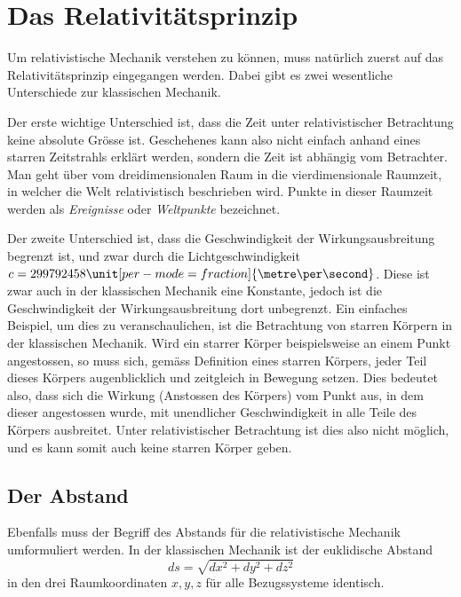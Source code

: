 
\section{Das Relativitätsprinzip 
\label{relativ:section:relativistik}}

Um relativistische Mechanik verstehen zu können,
muss natürlich zuerst auf das Relativitätsprinzip eingegangen werden.
Dabei gibt es zwei wesentliche Unterschiede zur klassischen Mechanik.

Der erste wichtige Unterschied ist, dass die Zeit unter relativistischer Betrachtung keine absolute Grösse ist.
Geschehenes kann also nicht einfach anhand eines starren Zeitstrahls erklärt werden, sondern die Zeit ist abhängig vom Betrachter.
Man geht über vom dreidimensionalen Raum in die vierdimensionale Raumzeit, in welcher die Welt relativistisch beschrieben wird.
Punkte in dieser Raumzeit werden als \emph{Ereignisse} oder \emph{Weltpunkte} bezeichnet.

Der zweite Unterschied ist,
dass die Geschwindigkeit der Wirkungsausbreitung begrenzt ist,
und zwar durch die Lichtgeschwindigkeit
\(c=299792458\unit[per-mode = fraction]{\metre\per\second}\).
Diese ist zwar auch in der klassischen Mechanik eine Konstante,
jedoch ist die Geschwindigkeit der Wirkungsausbreitung dort unbegrenzt.
Ein einfaches Beispiel, um dies zu veranschaulichen,
ist die Betrachtung von starren Körpern in der klassischen Mechanik.
Wird ein starrer Körper beispielsweise an einem Punkt angestossen,
so muss sich, gemäss Definition eines starren Körpers,
jeder Teil dieses Körpers augenblicklich und zeitgleich in Bewegung setzen.
Dies bedeutet also, dass sich die Wirkung (Anstossen des Körpers)
vom Punkt aus, in dem dieser angestossen wurde,
mit unendlicher Geschwindigkeit in alle Teile des Körpers ausbreitet.
Unter relativistischer Betrachtung ist dies also nicht möglich,
und es kann somit auch keine starren Körper geben.


\subsection{Der Abstand 
\label{relativ:section:abstand}}

Ebenfalls muss der Begriff des Abstands für die relativistische Mechanik umformuliert werden.
In der klassischen Mechanik ist der euklidische Abstand
\begin{equation}
    ds=\sqrt{dx^2 + dy^2 + dz^2}
    \label{relativ:eqn:abstand-klass}
\end{equation}
in den drei Raumkoordinaten \(x, y, z\)
für alle Bezugssysteme identisch.

